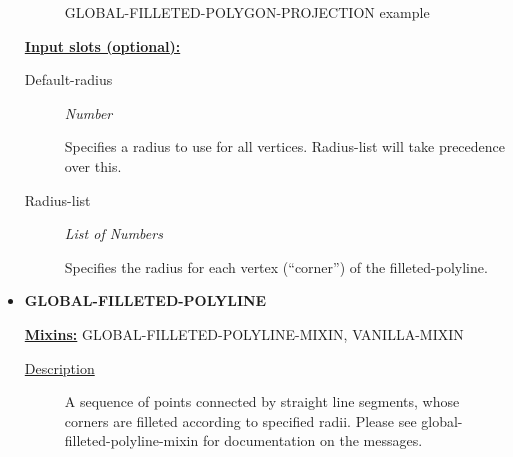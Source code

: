 \documentclass [11pt]{book}
\begin{document}
\begin{itemize}
\begin{figure}
\caption{GLOBAL-FILLETED-POLYGON-PROJECTION example}

\label{fig:GLOBAL-FILLETED-POLYGON-PROJECTION}

\end{figure}





\textbf{
\underline{Input slots (optional):}}

\begin{description}

\item [Default-radius]
\emph{Number}

 Specifies a radius to use for all vertices. Radius-list will take precedence over this.




\item [Radius-list]
\emph{List of Numbers}

 Specifies the radius for each vertex (``corner'') of the filleted-polyline.




\end{description}







\item {}
\label{prim:global-filleted-polyline}
\textbf{GLOBAL-FILLETED-POLYLINE}


\textbf{
\underline{Mixins:}} GLOBAL-FILLETED-POLYLINE-MIXIN, VANILLA-MIXIN





\begin{description}

\item [
\underline{Description}]


A sequence of points connected by straight line segments, whose
corners are filleted according to specified radii. Please see global-filleted-polyline-mixin
for documentation on the messages.



\end{description}




\begin{figure}
\begin{lrbox}{\boxedverb}
\begin{minipage}{\linewidth}
{\small

}
\end{minipage}
\end{lrbox}
\end{figure}
\end{itemize}
\end{document}
